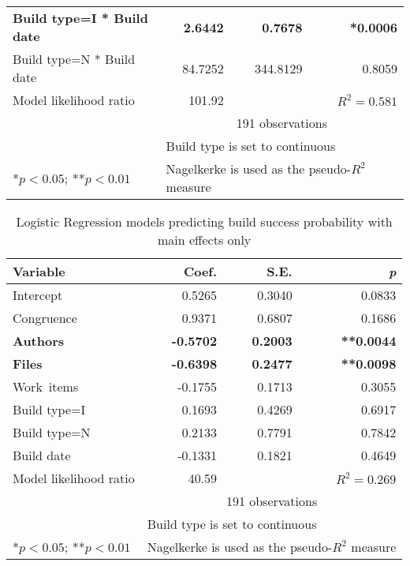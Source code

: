 \begin{table}[t]
\begin{center}
\begin{tabular}{l@{\hspace{15pt}}rrr}
\textbf{Build type=I * Build date}          &   \textbf{2.6442} &   \textbf{0.7678} & \textbf{*0.0006} \\
Build type=N * Build date          &  84.7252 & 344.8129 & 0.8059  \\
	\bottomrule
Model likelihood ratio & 101.92 &  & $R^2=0.581$  \\
& \multicolumn{3}{c}{191 observations}  \\
\multicolumn{1}{l}{ } & \multicolumn{3}{l}{\scriptsize{Build type is set to continuous}} \\
\multicolumn{1}{l}{\scriptsize{*$p < 0.05$; **$p < 0.01$}} & \multicolumn{3}{l}{\scriptsize{Nagelkerke is used as the pseudo-$R^2$ measure}}
\end{tabular}
\end{center}
\label{tab:logr}
\end{table}


\begin{table}[t]
\begin{center}
\caption{Logistic Regression models predicting build success probability with main effects only}
\label{tab:logr_maineffects}
\begin{tabular}{l@{\hspace{15pt}}rr r}
\toprule
Variable & Coef. & S.E. & \emph{p} \\
	\midrule                                                                
	Intercept                &  0.5265 & 0.3040 & 0.0833 \\
	Congruence               &  0.9371 & 0.6807 & 0.1686 \\
	\textbf{Authors}         & \textbf{-0.5702} & \textbf{0.2003} & \textbf{**0.0044}  \\
	\textbf{Files}           & \textbf{-0.6398} & \textbf{0.2477} & \textbf{**0.0098} \\
	Work~items                & -0.1755 & 0.1713 & 0.3055  \\
	Build type=I                   &  0.1693 & 0.4269 & 0.6917  \\
	Build type=N                   &  0.2133 & 0.7791 & 0.7842  \\
	Build date               & -0.1331 & 0.1821 & 0.4649  \\
	\bottomrule
Model likelihood ratio & 40.59 &  & $R^2=0.269$  \\
& \multicolumn{3}{c}{191 observations}  \\
\multicolumn{1}{l}{ } & \multicolumn{3}{l}{\scriptsize{Build type is set to continuous}} \\
\multicolumn{1}{l}{\scriptsize{*$p < 0.05$; **$p < 0.01$}} & \multicolumn{3}{l}{\scriptsize{Nagelkerke is used as the pseudo-$R^2$ measure}}
\end{tabular}
\end{center}
\end{table}


